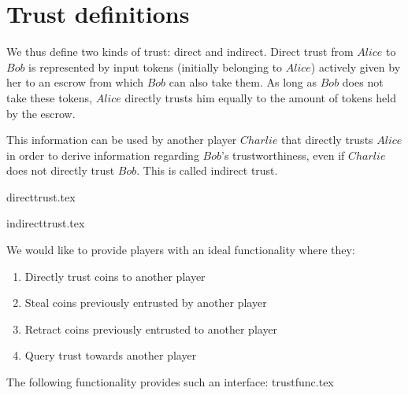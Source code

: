 \section{Trust definitions}
  We thus define two kinds of trust: direct and indirect. Direct trust from $Alice$ to $Bob$ is represented by input tokens
  (initially belonging to $Alice$) actively given by her to an escrow from which $Bob$ can also take them. As long as $Bob$
  does not take these tokens, $Alice$ directly trusts him equally to the amount of tokens held by the escrow.
  
  This information can be used by another player $Charlie$ that directly trusts $Alice$ in order to derive information
  regarding $Bob$'s trustworthiness, even if $Charlie$ does not directly trust $Bob$. This is called indirect trust.

  {directtrust.tex}

  {indirecttrust.tex}

  We would like to provide players with an ideal functionality where they:
  \begin{enumerate}
    \item Directly trust coins to another player
    \item Steal coins previously entrusted by another player
    \item Retract coins previously entrusted to another player
    \item Query trust towards another player
  \end{enumerate}
  The following functionality provides such an interface:
  {trustfunc.tex}
